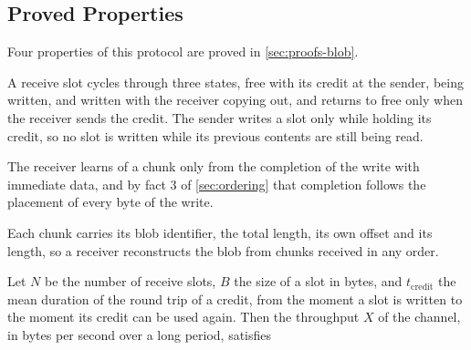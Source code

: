 
\subsection{Proved Properties}

Four properties of this protocol are proved in \cref{sec:proofs-blob}.

\begin{proposition}
\label{prop:slots}%
A receive slot cycles through three states, free with its credit at the
sender, being written, and written with the receiver copying out, and returns
to free only when the receiver sends the credit. The sender writes a slot only
while holding its credit, so no slot is written while its previous contents
are still being read.
\end{proposition}

\begin{proposition}
\label{prop:notify}%
The receiver learns of a chunk only from the completion of the write with
immediate data, and by fact 3 of \cref{sec:ordering} that completion follows
the placement of every byte of the write.
\end{proposition}

\begin{proposition}
\label{prop:reassembly}%
Each chunk carries its blob identifier, the total length, its own offset and
its length, so a receiver reconstructs the blob from chunks received in any
order.
\end{proposition}

\begin{proposition}
\label{prop:credit}%
Let $N$ be the number of receive slots, $B$ the size of a slot in bytes, and
$t_{\text{credit}}$ the mean duration of the round trip of a credit, from the
moment a slot is written to the moment its credit can be used again. Then the
throughput $X$ of the channel, in bytes per second over a long period,
satisfies
\par %
\end{proposition}

